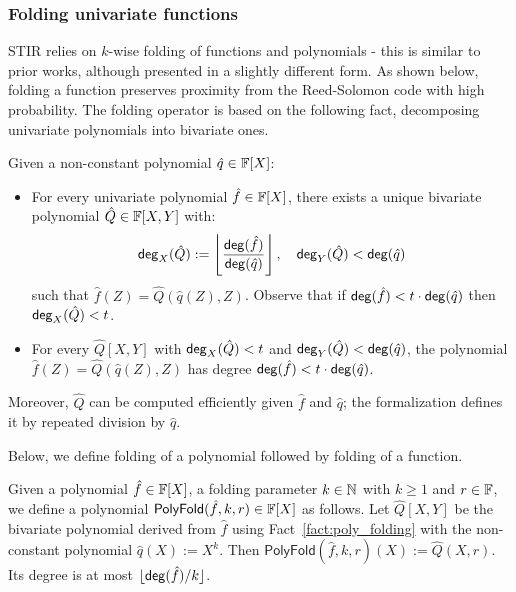 \subsubsection{Folding univariate functions}\label{sec:folding_uf}
STIR relies on $k$-wise folding of functions and polynomials - this is similar to prior works, although presented in a slightly different form. As shown below, folding a function preserves proximity from the Reed-Solomon code with high probability. The folding operator is based on the following fact, decomposing univariate polynomials into bivariate ones.

\begin{lemma}\label{fact:poly_folding}
\leanok
Given a non-constant polynomial $\hat{q}\in\mathbb{F}[X]$:
\begin{itemize}
        \item For every univariate polynomial $\hat{f}\in\mathbb{F}[X]$, there exists a unique bivariate polynomial $\hat{Q}\in\mathbb{F}[X,Y]$ with:
        \[
          \mathsf{deg}_X(\hat{Q}) := \left\lfloor \frac{\mathsf{deg}(\hat{f})}{\mathsf{deg}(\hat{q})} \right\rfloor,\quad \mathsf{deg}_Y(\hat{Q}) < \mathsf{deg}(\hat{q})
        \]
        such that $\hat{f}(Z)=\hat{Q}(\hat{q}(Z),Z)$. Observe that if $\mathsf{deg}(\hat{f})<t\cdot\mathsf{deg}(\hat{q})$ then
        $\mathsf{deg}_X(\hat{Q})<t$.

        \item For every $\hat{Q}[X,Y]$ with $\mathsf{deg}_X(\hat{Q})<t$ and $\mathsf{deg}_Y(\hat{Q})<\mathsf{deg}(\hat{q})$, the polynomial $\hat{f}(Z)=\hat{Q}(\hat{q}(Z),Z)$ has degree $\mathsf{deg}(\hat{f})<t\cdot\mathsf{deg}(\hat{q})$.
\end{itemize}
\end{lemma}

Moreover, $\hat{Q}$ can be computed efficiently given $\hat{f}$ and $\hat{q}$; the formalization
defines it by repeated division by $\hat{q}$.

Below, we define folding of a polynomial followed by folding of a function.
\begin{definition}\label{def:poly_folding}
\leanok
{}
    Given a polynomial $\hat{f}\in\mathbb{F}[X]$, a folding parameter $k\in\mathbb{N}$ with $k\ge1$ and $r\in\mathbb{F}$, we define a polynomial $\mathsf{PolyFold}(\hat{f},k,r)\in\mathbb{F}[X]$ as follows. Let $\hat{Q}[X,Y]$ be the bivariate polynomial derived from $\hat{f}$ using Fact~\ref{fact:poly_folding} with the non-constant polynomial $\hat{q}(X):=X^k$. Then $\mathsf{PolyFold}(\hat{f},k,r)(X):=\hat{Q}(X,r)$. Its degree is at most $\lfloor\mathsf{deg}(\hat{f})/k\rfloor$.
\end{definition}

